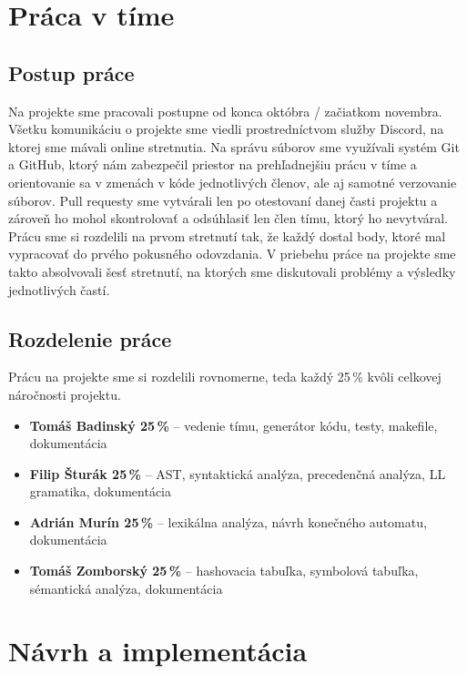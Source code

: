\documentclass{article}
\begin{document}
\section{Práca v tíme}
    \subsection{Postup práce}
    Na projekte sme pracovali postupne od konca októbra / začiatkom novembra. Všetku komunikáciu o projekte sme viedli prostredníctvom služby Discord, na ktorej sme mávali online stretnutia. Na správu súborov sme využívali systém Git a GitHub, ktorý nám zabezpečil priestor na prehľadnejšiu prácu v tíme a orientovanie sa v zmenách v kóde jednotlivých členov, ale aj samotné verzovanie súborov. Pull requesty sme vytvárali len po otestovaní danej časti projektu a zároveň ho mohol skontrolovať a odsúhlasiť len člen tímu, ktorý ho nevytváral. Prácu sme si rozdelili na prvom stretnutí tak, že každý dostal body, ktoré mal vypracovať do prvého pokusného odovzdania. V priebehu práce na projekte sme takto absolvovali šesť stretnutí, na ktorých sme diskutovali problémy a výsledky jednotlivých častí.
    \subsection{Rozdelenie práce}
    Prácu na projekte sme si rozdelili rovnomerne, teda každý 25\,\% kvôli celkovej náročnosti projektu.
    \begin{itemize}
        \item \textbf{Tomáš Badinský 25\,\%} -- vedenie tímu, generátor kódu, testy, makefile, dokumentácia
        \item \textbf{Filip Šturák 25\,\%} -- AST, syntaktická analýza, precedenčná analýza, LL gramatika, dokumentácia
        \item \textbf{Adrián Murín 25\,\%} -- lexikálna analýza, návrh konečného automatu, dokumentácia
        \item \textbf{Tomáš Zomborský 25\,\%} -- hashovacia tabuľka, symbolová tabuľka, sémantická analýza, dokumentácia
    \end{itemize}
\section{Návrh a implementácia}
\end{document}
